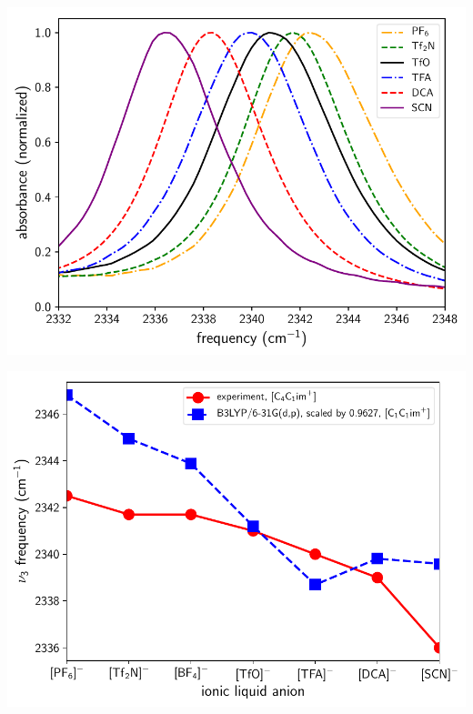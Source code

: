 \documentclass{beamer}
\begin{document}
\begin{frame}
  \centering
  \includegraphics[scale=0.70]{./figures/experimental_spectra_shifting.pdf}
\end{frame}

\begin{frame}
  \centering
  \includegraphics[scale=0.70]{./figures/frequencies_calc_vs_expt1.pdf}
\end{frame}
\end{document}
